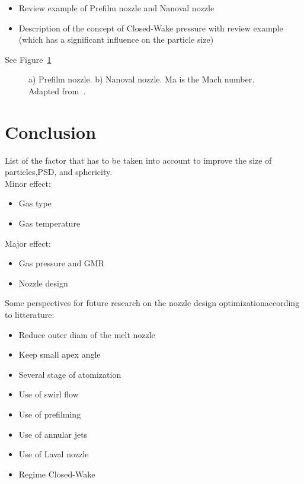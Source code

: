 \documentclass[final,5p,times,twocolumn]{elsarticle}
\begin{document}
\begin{itemize}
  \item Review example of Prefilm nozzle and Nanoval nozzle
  \item Description of the concept of Closed-Wake pressure with review example (which has a significant influence on the particle size)
\end{itemize}

See Figure~\ref{prefilm_and_nanoval}

\begin{figure}
    \centering
        
        \caption[Prefilm and Nanoval nozzle]{a) Prefilm nozzle. b) Nanoval nozzle. Ma is the Mach number. Adapted from~\cite{Neikov2009HandbookNonFerrous,Cacace2024InvestigationEffect}.}
        \label{prefilm_and_nanoval}
\end{figure}


\section{Conclusion}

List of the factor that has to be taken into account to improve the size of particles,PSD, and sphericity.\\

Minor effect:
\begin{itemize}
  \item Gas type
  \item Gas temperature
\end{itemize}

Major effect:
\begin{itemize}
  \item Gas pressure and GMR
  \item Nozzle design
\end{itemize}

Some perspectives for future research on the nozzle design optimizationaccording to litterature:
\begin{itemize}
  \item Reduce outer diam of the melt nozzle
  \item Keep small apex angle
  \item Several stage of atomization
  \item Use of swirl flow
  \item Use of prefilming
  \item Use of annular jets
  \item Use of Laval nozzle
  \item Regime Closed-Wake
\end{itemize}
\end{document}
